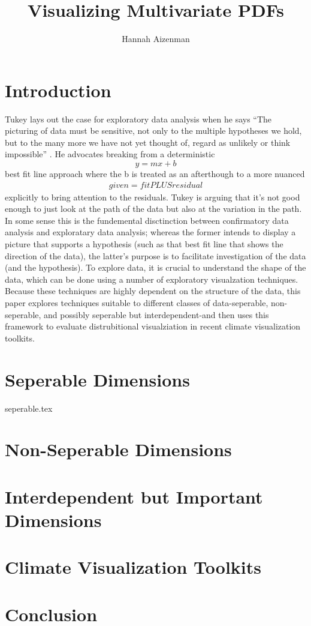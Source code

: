 \documentclass[letterpaper,onecolumn,titlepage]{Ythesis}
\title{Visualizing Multivariate PDFs}
\author{Hannah Aizenman}
\begin{document}
\makefrontmatter

\section{Introduction}
Tukey lays out the case for exploratory data analysis when
he says ``The picturing of data must be sensitive, not only to the multiple
hypotheses we hold, but to the many more we have not yet thought of, regard as unlikely or
think impossible'' \cite{tukey1975}. He advocates breaking from a deterministic $$y=mx+b$$
best fit line approach where the b is treated as an afterthough to a more
nuanced
\begin{align*}
  given = fit PLUS residual
\end{align*}
explicitly to bring attention to the residuals. Tukey is arguing that it's not
good enough to just look at the path of the data but also at the variation in
the path. In some sense this is the fundemental disctinction between
confirmatory data analysis and exploratary data analysis; whereas the former
intends to display a picture that supports a hypothesis (such as that best fit
line that shows the direction of the data), the latter's purpose is to
facilitate investigation of the data (and the hypothesis). To explore data, it
is crucial to understand the shape of the data, which can be done using a
number of exploratory visualzation techniques. Because these techniques are
highly dependent on the structure of the data, this paper explores techniques suitable to different classes of data-seperable, non-seperable, and
possibly seperable but interdependent-and then uses this framework to evaluate
distrubitional visualziation in recent climate visualization toolkits. 

\section{Seperable Dimensions}
{seperable.tex}
\section{Non-Seperable Dimensions}
\section{Interdependent but Important Dimensions}
\section{Climate Visualization Toolkits}

\section{Conclusion}
\label{sec:conclusion}


\pagebreak


\end{document}
